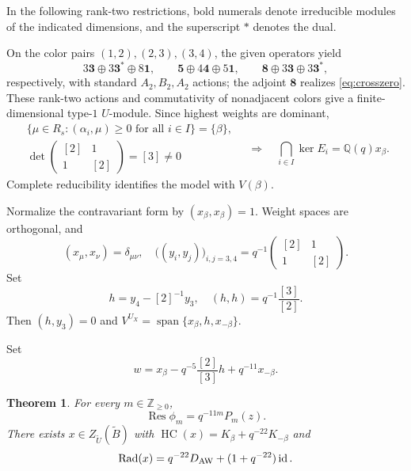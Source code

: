 \documentclass[12pt,reqno]{amsart}
\theoremstyle{plain}
\newtheorem{theorem}{Theorem}[section]
\theoremstyle{definition}
\numberwithin{equation}{section}
\newcommand{\kk}{\mathbb Q(q)}
\newcommand{\Res}{\operatorname{Res}}
\newcommand{\Rad}{\operatorname{Rad}}
\newcommand{\HC}{\operatorname{HC}}
\newcommand{\Span}{\operatorname{span}}
\newcommand{\id}{\operatorname{id}}
\begin{document}
In the following rank-two restrictions, bold numerals denote
irreducible modules of the indicated dimensions, and the
superscript $*$ denotes the dual.

On the color pairs $(1,2),(2,3),(3,4)$, the given operators yield
\[
3\mathbf3\oplus3\mathbf3^*\oplus8\mathbf1,\qquad
\mathbf5\oplus4\mathbf4\oplus5\mathbf1,\qquad
\mathbf8\oplus3\mathbf3\oplus3\mathbf3^*,
\]
respectively, with standard $A_2,B_2,A_2$ actions; the adjoint
$\mathbf8$ realizes \eqref{eq:crosszero}.
These rank-two actions and commutativity of nonadjacent colors
give a finite-dimensional type-$1$ $U$-module.
Since highest weights are dominant,
\[
\begin{gathered}
	\{\mu\in R_s:(\alpha_i,\mu)\ge0\text{ for all }i\in I\}
	=\{\beta\},\\
	\det\begin{pmatrix}[2]&1\\1&[2]\end{pmatrix}=[3]\ne0
\end{gathered}
\quad\Longrightarrow\quad
\bigcap_{i\in I}\ker E_i=\kk x_\beta.
\]
Complete reducibility identifies the model with $V(\beta)$.

Normalize the contravariant form by $(x_\beta,x_\beta)=1$.
Weight spaces are orthogonal, and
\begin{equation}\label{eq:GramV}
	(x_\mu,x_\nu)=\delta_{\mu\nu},\quad
	\bigl((y_i,y_j)\bigr)_{i,j=3,4}
	=q^{-1}\begin{pmatrix}[2]&1\\1&[2]\end{pmatrix}.
\end{equation}
Set
\begin{equation}\label{eq:h}
	h=y_4-[2]^{-1}y_3,\quad
	(h,h)=q^{-1}\frac{[3]}{[2]}.
\end{equation}
Then $(h,y_3)=0$ and
$V^{U_X}=\Span\{x_\beta,h,x_{-\beta}\}$.

Set
\begin{equation}\label{eq:w}
 w=x_\beta-q^{-5}\frac{[2]}{[3]}h+q^{-11}x_{-\beta}.
\end{equation}

\begin{theorem}\label{thm:main}
For every $m\in\mathbb Z_{\ge0}$,
\begin{equation}\label{eq:main}
 \Res\phi_m=q^{-11m}P_m(z).
\end{equation}
There exists $x\in Z_{\widetilde U}(\widetilde B)$ with
$\HC(x)=K_\beta+q^{-22}K_{-\beta}$ and
\begin{equation}\label{eq:mainradial}
 \Rad(x)=q^{-22}D_{\rm AW}+(1+q^{-22})\id.
\end{equation}
\end{theorem}
\end{document}
